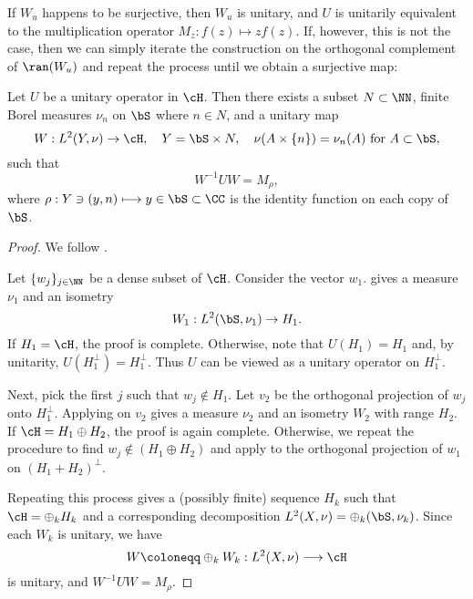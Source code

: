 \documentclass[oneside,reqno,letterpaper]{amsart}
\begin{document}
If \(W_u\) happens to be surjective, then \(W_u\) is unitary, and \(U\) is unitarily equivalent to the multiplication operator \(M_z: f(z) \mapsto z f(z)\). 
If, however, this is not the case, then we can simply iterate the construction on the orthogonal complement of \(\ran(W_u)\) and repeat the process until we obtain a surjective map: 



\begin{theorem}
\label{thm:spectral-thm-unitary-operator}
  Let \(U\) be a unitary operator in \(\cH\). 
  Then there exists a subset \(N \subset \NN\), finite Borel measures \(\nu_n\) on \(\bS\) where \(n \in N\), and a unitary map \[
  W: L^2(Y, \nu) \to \cH, \quad Y = \bS \times N, \quad \nu(A \times \{n\}) = \nu_n(A) \text{ for } A \subset \bS, 
  \] 
  such that 
  \[
    W^{-1} U W = M_{\rho}, 
  \]
  where \(\rho: Y \ni (y, n) \longmapsto y \in \bS \subset \CC\) is the identity function on each copy of \(\bS\). 
\end{theorem}
\begin{proof}
  We follow \cite{borthwick2020spectral}. 

  Let \(\{w_j\}_{j \in \NN}\) be a dense subset of \(\cH\). Consider the vector \(w_1\).  gives a measure \(\nu_1\) and an isometry
  \[
    W_1: L^2(\bS, \nu_1) \to H_1. 
  \]
  If \(H_1 = \cH\), the proof is complete. 
  Otherwise, note that \(U(H_1) = H_1\) and, by unitarity, \(U(H_1^\perp) = H_1^\perp\). 
  Thus \(U\) can be viewed as a unitary operator on \(H_1^\perp\). 

  Next, pick the first \(j\) such that \(w_j \not\in H_1\). 
  Let \(v_2\) be the orthogonal projection of \(w_j\) onto \(H_1^\perp\). 
  Applying  on \(v_2\) gives a measure \(\nu_2\) and an isometry \(W_2\) with range \(H_2\). 
  If \(\cH = H_1 \oplus H_2\), the proof is again complete. 
  Otherwise, we repeat the procedure to find \(w_j \not\in (H_1 \oplus H_2)\) and apply  to the orthogonal projection of \(w_1\) on \((H_1 + H_2)^\perp\). 

  Repeating this process gives a (possibly finite) sequence \(H_k\) such that \(\cH = \oplus_{k} H_k\) and a corresponding decomposition \(L^2(X, \nu) = \oplus_{k} (\bS, \nu_k)\). 
  Since each \(W_k\) is unitary, we have
  \[
    W \coloneqq \oplus_k W_k : L^2(X, \nu) \longrightarrow \cH 
  \] 
  is unitary, and \(W^{-1}UW = M_{\rho}\). 
\end{proof}
\end{document}
